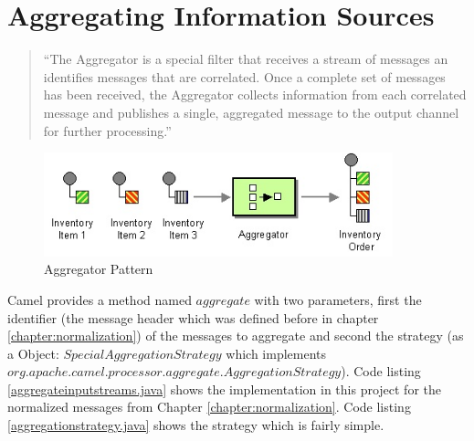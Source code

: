\documentclass[11pt,english,ngerman, headsepline]{scrreprt}
\begin{document}





\chapter{Aggregating Information Sources} 



\begin{quote}
``The Aggregator is a special filter that receives a stream of messages an
identifies messages that are correlated. Once a complete set of messages has
been received, the Aggregator collects information from each correlated message
and publishes a single, aggregated message to the output channel for further
processing.'' \cite{hohpe2003enterprise}
\end{quote}

  \begin{figure}[h!]
	\begin{center}
	\includegraphics[width=0.9\textwidth]{pics/Aggregator.jpg}
	\end{center}
	\caption{Aggregator Pattern \cite{hohpe2003enterprise}}
	\label{utilityTree} 
   \end{figure}


Camel provides a method named $aggregate$ with two parameters, first the
identifier (the message header which was defined before in chapter
\ref{chapter:normalization}) of the messages to aggregate  and second the
strategy (as a Object: $SpecialAggregationStrategy$ which implements\\
$org.apache.camel.processor.aggregate.AggregationStrategy$). Code listing
\ref{aggregateinputstreams.java} shows the implementation in this project for
the normalized messages from Chapter \ref{chapter:normalization}. Code listing
\ref{aggregationstrategy.java} shows the strategy which is fairly simple.



\end{document}
